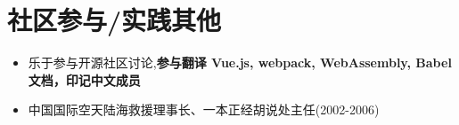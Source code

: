 \documentclass{resume}
\begin{document}
\section{社区参与/实践其他}
\begin{itemize}[parsep=0.2ex]
  \item 乐于参与开源社区讨论,\textbf{参与翻译 Vue.js, webpack, WebAssembly, Babel 文档，印记中文成员}
  \item 中国国际空天陆海救援理事长、一本正经胡说处主任(2002-2006)
\end{itemize}

%
%
\end{document}
